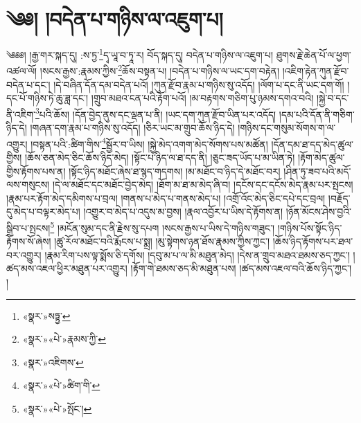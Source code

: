 \chapter{༄༅། །བདེན་པ་གཉིས་ལ་འཇུག་པ།}༄༅༅། །རྒྱ་གར་སྐད་དུ། :ས་ཏྱ་\footnote{«སྣར་»སཏྟྱ་}དྭ་ཡཱ་བ་ཏཱ་ར། བོད་སྐད་དུ། བདེན་པ་གཉིས་ལ་འཇུག་པ། ཐུགས་རྗེ་ཆེན་པོ་ལ་ཕྱག་འཚལ་ལོ། །སངས་རྒྱས་:རྣམས་ཀྱིས་\footnote{«སྣར་»«པེ་»རྣམས་ཀྱི་}ཆོས་བསྟན་པ། །བདེན་པ་གཉིས་ལ་ཡང་དག་བརྟེན། །འཇིག་རྟེན་ཀུན་རྫོབ་བདེན་པ་དང་། །དེ་བཞིན་དོན་དམ་བདེན་པའོ། །ཀུན་རྫོབ་རྣམ་པ་གཉིས་སུ་འདོད། །ལོག་པ་དང་ནི་ཡང་དག་གོ། །དང་པོ་གཉིས་ཏེ་ཆུ་ཟླ་དང་། །གྲུབ་མཐའ་ངན་པའི་རྟོག་པའོ། །མ་བརྟགས་གཅིག་པུ་ཉམས་དགའ་བའི། །སྐྱེ་བ་དང་ནི་འཇིག་\footnote{«སྣར་»འཇིགས་}པའི་ཆོས། །དོན་བྱེད་ནུས་དང་ལྡན་པ་ནི། །ཡང་དག་ཀུན་རྫོབ་ཡིན་པར་འདོད། །དམ་པའི་དོན་ནི་གཅིག་ཉིད་དེ། །གཞན་དག་རྣམ་པ་གཉིས་སུ་འདོད། །ཅིར་ཡང་མ་གྲུབ་ཆོས་ཉིད་དེ། །གཉིས་དང་གསུམ་སོགས་ག་ལ་འགྱུར། །བསྟན་པའི་:ཚིག་གིས་\footnote{«སྣར་»«པེ་»ཚིག་གི་}སྦྱོར་བ་ཡིས། །སྐྱེ་མེད་འགག་མེད་སོགས་པས་མཚོན། །དོན་དམ་ཐ་དད་མེད་ཚུལ་གྱིས། །ཆོས་ཅན་མེད་ཅིང་ཆོས་ཉིད་མེད། །སྟོང་པ་ཉིད་ལ་ཐ་དད་ནི། །ཅུང་ཟད་ཡོད་པ་མ་ཡིན་ཏེ། །རྟོག་མེད་ཚུལ་གྱིས་རྟོགས་པས་ན། །སྟོང་ཉིད་མཐོང་ཞེས་ཐ་སྙད་གདགས། །མ་མཐོང་བ་ཉིད་དེ་མཐོང་བར། །ཤིན་ཏུ་ཟབ་པའི་མདོ་ལས་གསུངས། །དེ་ལ་མཐོང་དང་མཐོང་བྱེད་མེད། །ཐོག་མ་ཐ་མ་མེད་ཞི་བ། །དངོས་དང་དངོས་མེད་རྣམ་པར་སྤངས། །རྣམ་པར་རྟོག་མེད་དམིགས་པ་བྲལ། །གནས་པ་མེད་པ་གནས་མེད་པ། །འགྲོ་འོང་མེད་ཅིང་དཔེ་དང་བྲལ། །བརྗོད་དུ་མེད་པ་བལྟར་མེད་པ། །འགྱུར་བ་མེད་པ་འདུས་མ་བྱས། །རྣལ་འབྱོར་པ་ཡིས་དེ་རྟོགས་ན། །ཉོན་མོངས་ཤེས་བྱའི་སྒྲིབ་པ་སྤངས།\footnote{«སྣར་»«པེ་»སྤོང་།} །མངོན་སུམ་དང་ནི་རྗེས་སུ་དཔག །སངས་རྒྱས་པ་ཡིས་དེ་གཉིས་གཟུང་། །གཉིས་པོས་སྟོང་ཉིད་རྟོགས་སོ་ཞེས། །ཚུ་རོལ་མཐོང་བའི་རྨོངས་པ་སྨྲ། །མུ་སྟེགས་ཉན་ཐོས་རྣམས་ཀྱིས་ཀྱང་། །ཆོས་ཉིད་རྟོགས་པར་ཐལ་བར་འགྱུར། །རྣམ་རིག་པས་ལྟ་སྨོས་ཅི་དགོས། །དབུ་མ་པ་ལ་མི་མཐུན་མེད། །དེས་ན་གྲུབ་མཐའ་ཐམས་ཅད་ཀྱང་། །ཚད་མས་འཇལ་ཕྱིར་མཐུན་པར་འགྱུར། །རྟོག་གེ་ཐམས་ཅད་མི་མཐུན་པས། །ཚད་མས་འཇལ་བའི་ཆོས་ཉིད་ཀྱང་། །
